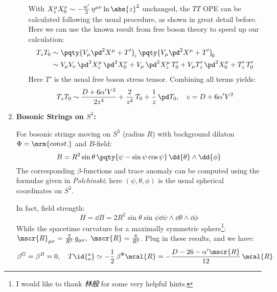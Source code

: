 \documentclass[a4paper,10pt]{article}
\begin{document}
\begin{enumerate}
\begin{enumerate}
	With $
		X^\mu_z X^\nu_0
		\sim -\frac{\alpha'}{2}\,\eta^{\mu\nu}
			\ln \abs{z}^2
	$ unchanged, the $TT$ OPE can be calculated following the usual procedure, as shown in great detail before. Here we can use the known result from free boson theory to speed up our calculation:
	\begin{equation}
	\begin{aligned}
		T_z T_0
		&\sim \pqty{
				V_\mu \pd^2 X^\mu + T'
			}_{\!z}\,\pqty{
				V_\mu \pd^2 X^\mu + T'
			}_{\!0} \\
		&\sim V_\mu V_\nu\,
				\pd^2 X^\mu_z\,\pd^2 X^\nu_0
			+ V_\mu\,\pd^2 X^\mu_z\,T'_0
			+ V_\mu T'_z\,\pd^2 X^\mu_0
			+ T'_z\,T'_0
	\end{aligned}
	\end{equation}
	Here $T'$ is the usual free boson stress tensor. Combining all terms yields:
	\begin{equation}
		T_z T_0
		\sim \frac{D + 6\alpha' V^2}{2z^4}
			+ \frac{2}{z^2}\,T_0
			+ \frac{1}{z}\,\pd T_0,\quad
		c = D + 6\alpha' V^2
	\end{equation}
	\vspace{-1.8\baselineskip}
	\end{enumerate}
	\qedfull
	
	\item \textbf{Bosonic Strings on $S^3$:}
	
	For bosonic strings moving on $S^3$ (radius $R$) with background dilaton $\Phi = \mrm{const.}$ and $B$-field:
	\begin{equation}
		B = R^2\sin\theta\,\pqty{
			\psi - \sin\psi \cos\psi
		}\,\dd{\theta}\wedge \dd{\phi}
	\end{equation}
	The corresponding $\beta$-functions and trace anomaly can be computed using the formulae given in \textit{Polchinski}; here $(\psi,\theta,\phi)$ is the usual spherical coordinates on $S^3$. 
\pagebreak[3]
	
	In fact, field strength:
	\begin{equation}
		H = \dd{B}
		= 2R^2 \sin\theta \sin\psi 
			\dd{\psi}
			\wedge\dd{\theta}
			\wedge\dd{\phi}
	\end{equation}
	While the spacetime curvature for a maximally symmetric sphere\footnote{
		I would like to thank \textit{林般} for some very helpful hints. 
	}: $
		\mscr{R}_{\mu\nu}
		= \frac{2}{R^2}\,g_{\mu\nu},\ %
		\mscr{R} = \frac{6}{R^2}
	$. Plug in these results, and we have:
	\begin{equation}
		\beta^G = \beta^B = 0,\quad
		T\id{^a_a}
		\simeq -\frac{1}{2}\,\beta^{\Phi} \mcal{R}
		= -\frac{D-26 - \alpha'\mscr{R}}{12}\,
			\mcal{R}
	\end{equation}
	

\end{enumerate}
\end{document}
